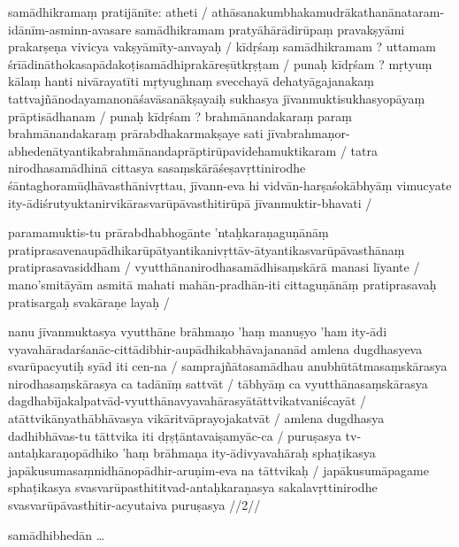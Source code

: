 \documentclass[12pt,parskip]{scrartcl}
\begin{document}
\begin{ekdosis}
  \begin{cjyo}[4.2]
    samādhikramaṃ pratijānīte: atheti /
    athāsanakumbhakamudrākathanānataram-idānīm-asminn-avasare samādhikramam pratyāhārādirūpaṃ pravakṣyāmi prakarṣeṇa vivicya vakṣyāmīty-anvayaḥ /
    kīdṛśaṃ samādhikramam ? uttamam śrīādināthokasapādakoṭisamādhiprakāreṣūtkṛṣṭam /
    punaḥ kīdṛśam ? mṛtyuṃ kālaṃ hanti nivārayatīti mṛtyughnaṃ svecchayā dehatyāgajanakaṃ tattvajñānodayamanonāśavāsanākṣayaiḥ sukhasya jīvanmuktisukhasyopāyaṃ prāptisādhanam /
    punaḥ kīdṛśam ? brahmānandakaraṃ paraṃ brahmānandakaraṃ prārabdhakarmakṣaye sati jīvabrahmaṇor-abhedenātyantikabrahmānandaprāptirūpavidehamuktikaram /
    tatra nirodhasamādhinā cittasya sasaṃskārāśeṣavṛttinirodhe śāntaghoramūḍhāvasthānivṛttau, jīvann-eva hi vidvān-harṣaśokābhyāṃ vimucyate ity-ādiśrutyuktanirvikārasvarūpāvasthitirūpā jīvanmuktir-bhavati /

    paramamuktis-tu prārabdhabhogānte 'ntaḥkaraṇaguṇānāṃ pratiprasavenaupādhikarūpātyantikanivṛttāv-ātyantikasvarūpāvasthānaṃ pratiprasavasiddham /
    vyutthānanirodhasamādhisaṃskārā manasi līyante /
    mano'smitāyām asmitā mahati mahān-pradhān-iti cittaguṇānāṃ pratiprasavaḥ pratisargaḥ svakāraṇe layaḥ /

    nanu jīvanmuktasya vyutthāne brāhmaṇo 'haṃ manuṣyo 'ham ity-ādi vyavahāradarśanāc-cittādibhir-aupādhikabhāvajananād amlena dugdhasyeva svarūpacyutiḥ syād iti cen-na /
    samprajñātasamādhau anubhūtātmasaṃskārasya nirodhasaṃskārasya ca tadānīṃ sattvāt /
    tābhyāṃ ca vyutthānasaṃskārasya dagdhabījakalpatvād-vyutthānavyavahārasyātāttvikatvaniścayāt /
    atāttvikānyathābhāvasya vikāritvāprayojakatvāt /
    amlena dugdhasya dadhibhāvas-tu tāttvika iti dṛṣṭāntavaiṣamyāc-ca /
    puruṣasya tv-antaḥkaraṇopādhiko 'haṃ brāhmaṇa ity-ādivyavahāraḥ sphaṭikasya japākusumasaṃnidhānopādhir-aruṇim-eva na tāttvikaḥ /
    japākusumāpagame sphaṭikasya svasvarūpasthititvad-antaḥkaraṇasya sakalavṛttinirodhe svasvarūpāvasthitir-acyutaiva puruṣasya //2//
  \end{cjyo}

  \begin{cpra}[7.2]
    samādhibhedān …
  \end{cpra}

  \begin{tlg}[4.3][8.50]%
    \\
  \end{tlg}


\end{ekdosis}
\end{document}
